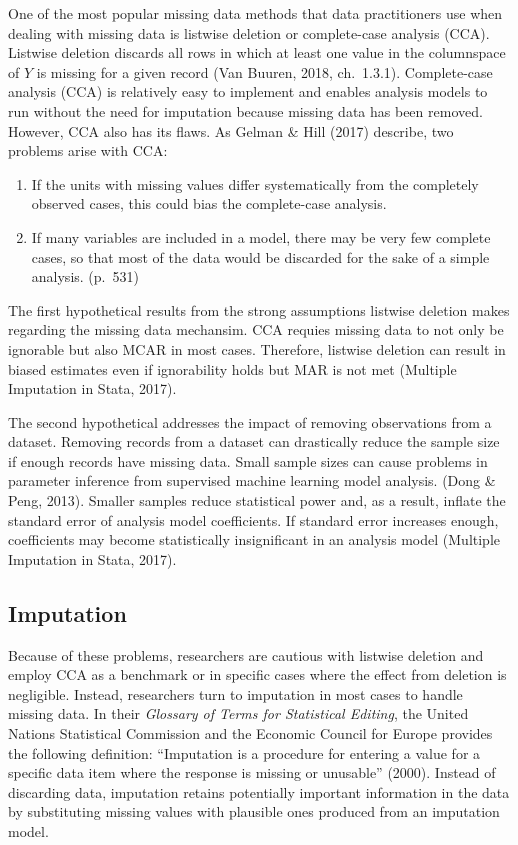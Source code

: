 \documentclass[12pt,oneside]{chicagocapstone}
\providecommand{\tightlist}{%
  \setlength{\itemsep}{0pt}\setlength{\parskip}{0pt}}
\begin{document}
One of the most popular missing data methods that data practitioners use
when dealing with missing data is listwise deletion or complete-case
analysis (CCA). Listwise deletion discards all rows in which at least
one value in the columnspace of \(Y\) is missing for a given record (Van
Buuren, 2018, ch.~1.3.1). Complete-case analysis (CCA) is relatively
easy to implement and enables analysis models to run without the need
for imputation because missing data has been removed. However, CCA also
has its flaws. As Gelman \& Hill (2017) describe, two problems arise
with CCA:
\begin{enumerate}
\def\labelenumi{\arabic{enumi}.}
\tightlist
\item
  If the units with missing values differ systematically from the
  completely observed cases, this could bias the complete-case analysis.
\item
  If many variables are included in a model, there may be very few
  complete cases, so that most of the data would be discarded for the
  sake of a simple analysis. (p.~531)
\end{enumerate}
The first hypothetical results from the strong assumptions listwise
deletion makes regarding the missing data mechansim. CCA requies missing
data to not only be ignorable but also MCAR in most cases. Therefore,
listwise deletion can result in biased estimates even if ignorability
holds but MAR is not met (Multiple Imputation in Stata, 2017).

The second hypothetical addresses the impact of removing observations
from a dataset. Removing records from a dataset can drastically reduce
the sample size if enough records have missing data. Small sample sizes
can cause problems in parameter inference from supervised machine
learning model analysis. (Dong \& Peng, 2013). Smaller samples reduce
statistical power and, as a result, inflate the standard error of
analysis model coefficients. If standard error increases enough,
coefficients may become statistically insignificant in an analysis model
(Multiple Imputation in Stata, 2017).

\subsection*{Imputation}\label{background-imputation}

Because of these problems, researchers are cautious with listwise
deletion and employ CCA as a benchmark or in specific cases where the
effect from deletion is negligible. Instead, researchers turn to
imputation in most cases to handle missing data. In their \emph{Glossary
of Terms for Statistical Editing}, the United Nations Statistical
Commission and the Economic Council for Europe provides the following
definition: ``Imputation is a procedure for entering a value for a
specific data item where the response is missing or unusable'' (2000).
Instead of discarding data, imputation retains potentially important
information in the data by substituting missing values with plausible
ones produced from an imputation model.
\end{document}

